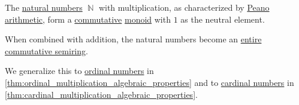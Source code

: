 \begin{proposition}\label{thm:natural_number_multiplication_properties}
  The \hyperref[def:natural_numbers]{natural numbers} \( \BbbN \) with multiplication, as characterized by \hyperref[def:peano_arithmetic]{Peano arithmetic}, form a \hyperref[def:binary_operation/commutative]{commutative} \hyperref[def:monoid]{monoid} with \( 1 \) as the neutral element.

  When combined with addition, the natural numbers become an \hyperref[def:entire_semiring]{entire} \hyperref[def:semiring/commutative]{commutative semiring}.
\end{proposition}
\begin{comments}
  \item We generalize this to \hyperref[def:ordinal]{ordinal numbers} in \cref{thm:ordinal_multiplication_algebraic_properties} and to \hyperref[def:cardinal]{cardinal numbers} in \cref{thm:cardinal_multiplication_algebraic_properties}.
\end{comments}
